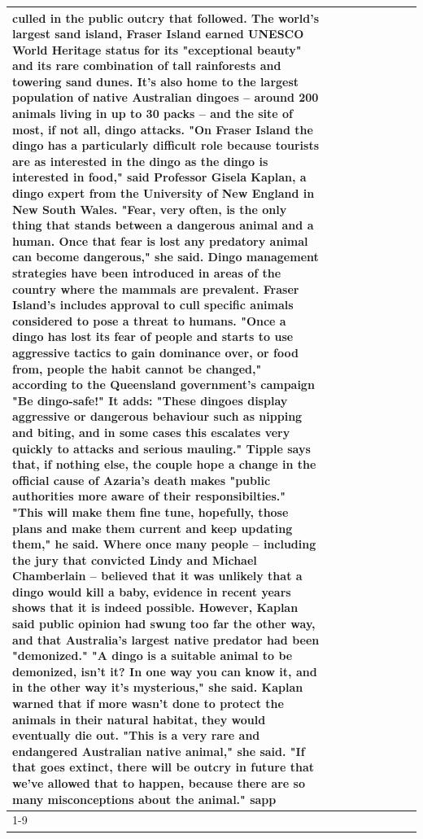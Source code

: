 \begin{table}[H]
\begin{tabular}{lllrlllll}
culled in the public outcry that followed. The world's largest sand island, Fraser Island earned UNESCO World Heritage status for its "exceptional beauty" and its rare combination of tall rainforests and towering sand dunes. It's also home to the largest population of native Australian dingoes -- around 200 animals living in up to 30 packs -- and the site of most, if not all, dingo attacks. "On Fraser Island the dingo has a particularly difficult role because tourists are as interested in the dingo as the dingo is interested in food," said Professor Gisela Kaplan, a dingo expert from the University of New England in New South Wales. "Fear, very often, is the only thing that stands between a dangerous animal and a human. Once that fear is lost any predatory animal can become dangerous," she said. Dingo management strategies have been introduced in areas of the country where the mammals are prevalent. Fraser Island's includes approval to cull specific animals considered to pose a threat to humans. "Once a dingo has lost its fear of people and starts to use aggressive tactics to gain dominance over, or food from, people the habit cannot be changed," according to the Queensland government's campaign "Be dingo-safe!" It adds: "These dingoes display aggressive or dangerous behaviour such as nipping and biting, and in some cases this escalates very quickly to attacks and serious mauling." Tipple says that, if nothing else, the couple hope a change in the official cause of Azaria's death makes "public authorities more aware of their responsibilties." "This will make them fine tune, hopefully, those plans and make them current and keep updating them," he said. Where once many people -- including the jury that convicted Lindy and Michael Chamberlain -- believed that it was unlikely that a dingo would kill a baby, evidence in recent years shows that it is indeed possible. However, Kaplan said public opinion had swung too far the other way, and that Australia's largest native predator had been "demonized." "A dingo is a suitable animal to be demonized, isn't it? In one way you can know it, and in the other way it's mysterious," she said. Kaplan warned that if more wasn't done to protect the animals in their natural habitat, they would eventually die out. "This is a very rare and endangered Australian native animal," she said. "If that goes extinct, there will be outcry in future that we've allowed that to happen, because there are so many misconceptions about the animal." sapp \\
\cline{1-9}

\end{tabular}
\end{table}
